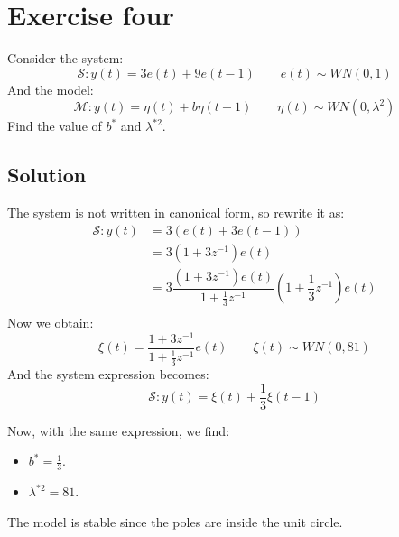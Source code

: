 \section{Exercise four}

Consider the system: 
\[\mathcal{S}:y(t)=3e(t)+9e(t-1)\qquad e(t)\sim WN(0,1)\]
And the model: 
\[\mathcal{M}:y(t)=\eta(t)+b\eta(t-1)\qquad \eta(t)\sim WN(0,\lambda^2)\]
Find the value of $b^\ast$ and $\lambda^{\ast 2}$. 

\subsection*{Solution}
The system is not written in canonical form, so rewrite it as:
\begin{align*}
    \mathcal{S}:y(t)    &=3\left(e(t)+3e(t-1)\right) \\
                        &=3\left(1+3z^{-1}\right)e(t) \\
                        &=3\dfrac{\left(1+3z^{-1}\right)e(t)}{1+\frac{1}{3}z^{-1}}\left(1+\dfrac{1}{3}z^{-1}\right)e(t) \\           
\end{align*}
Now we obtain:
\[\xi(t)=\dfrac{1+3z^{-1}}{1+\frac{1}{3}z^{-1}}e(t)\qquad \xi(t)\sim WN(0,81)\]
And the system expression becomes:
\[\mathcal{S}:y(t)=\xi(t)+\dfrac{1}{3}\xi(t-1)\]

Now, with the same expression, we find:
\begin{itemize}
    \item $b^\ast=\frac{1}{3}$.
    \item $\lambda^{\ast 2}=81$.
\end{itemize}
The model is stable since the poles are inside the unit circle.